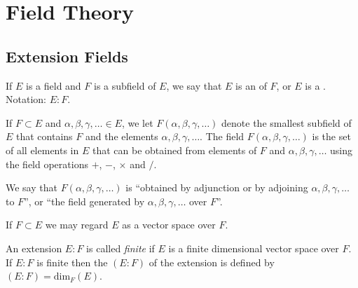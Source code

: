 \section{Field Theory}
\subsection{Extension Fields}
\begin{definition}
	If $E$ is a field and $F$ is a subfield of $E$, we say that $E$ is an  of $F$, or $E$ is a . Notation: $E:F$.
\end{definition}

If $F \subset E$ and $\alpha, \beta, \gamma, \dots \in E$, we let $F(\alpha, \beta, \gamma, \dots)$ denote the smallest subfield of $E$ that contains $F$ and the elements $\alpha, \beta, \gamma, \dots$. The field $F(\alpha, \beta, \gamma, \dots)$ is the set of all elements in $E$ that can be obtained from elements of $F$ and $\alpha, \beta, \gamma, \dots$ using the field operations $+$, $-$, $\times$ and $/$.

We say that $F(\alpha, \beta, \gamma, \dots)$ is ``obtained by adjunction or by adjoining $\alpha, \beta, \gamma, \dots$ to $F$'', or ``the field generated by $\alpha, \beta, \gamma, \dots$ over $F$''.

If $F \subset E$ we may regard $E$ as a vector space over $F$.

\begin{definition}
	An extension $E:F$ is called \emph{finite} if $E$ is a finite dimensional vector space over $F$. If $E:F$ is finite then the  $(E:F)$ of the extension is defined by $(E:F) = \text{dim}_F(E)$.
\end{definition}

